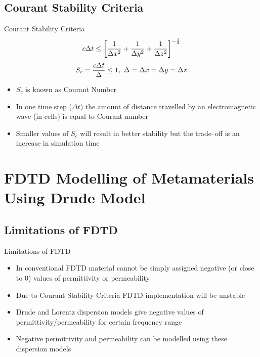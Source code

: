 \documentclass{beamer}
\begin{document}
\subsection{Courant Stability Criteria}
\begin{frame}{Courant Stability Criteria}
\begin{equation*}
\centering
c \Delta t \leq \left[ \dfrac{1}{\Delta x^2} + \dfrac{1}{\Delta y^2} + \dfrac{1}{\Delta z^2} \right]^{-\frac{1}{2}}
\label{Courant-Stability-Criterion}
\end{equation*}
\begin{equation*}
\centering
S_c = \dfrac{c \Delta t}{\Delta} \leq 1,~\Delta=\Delta x = \Delta y =\Delta z
\label{Courant-Stability-Criterion-Equal-Differentials}
\end{equation*}
	\begin{itemize}
	\item $S_c$ is known as Courant Number
	\item In one time step ($\Delta t$) the amount of distance travelled by an electromagnetic wave (in cells) is equal to Courant number
	\item  Smaller values of $S_c$ will result in better stability but the trade--off is an increase in simulation time
	\end{itemize}
\end{frame}
\section{FDTD Modelling of Metamaterials Using Drude Model}
\subsection{Limitations of FDTD}
\begin{frame}{Limitations of FDTD}
	\begin{itemize}
	\item In conventional FDTD material cannot be simply assigned negative (or close to 0) values of permittivity or permeability
	\item Due to Courant Stability Criteria FDTD implementation will be unstable
	\item Drude and Lorentz dispersion models give negative values of permittivity/permeability for certain frequency range
	\item Negative permittivity and permeability can be modelled using these dispersion models
	\end{itemize}
\end{frame}
\end{document}

